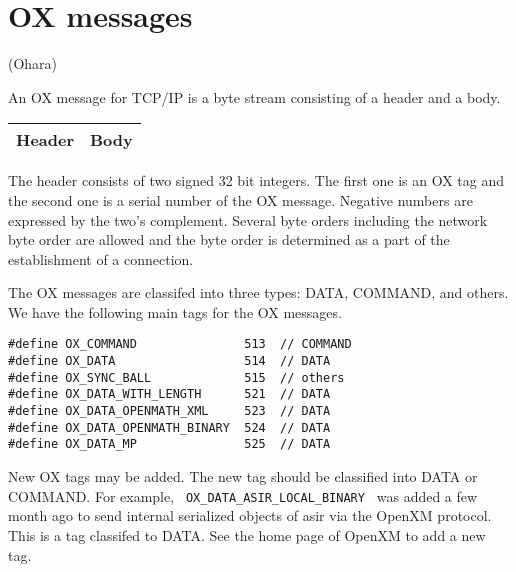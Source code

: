 
\section{OX messages}  (Ohara)

An OX message for TCP/IP is a byte stream consisting of
a header and a body.
\begin{center}
\begin{tabular}{|c|c|}
\hline
Header	& \hspace{10mm} Body \hspace{10mm} \\
\hline
\end{tabular}
\end{center}
The header consists of two signed 32 bit integers.
The first one is an OX tag 
and the second one is a serial number of the OX message.
Negative numbers are expressed by the two's complement.
Several byte orders including the network byte order
are allowed and the byte order is determined as a part of
the establishment of a connection.

The OX messages are classifed into three types:
DATA, COMMAND, and others.
We have the following main tags for the OX messages.
\begin{verbatim}
#define	OX_COMMAND               513  // COMMAND
#define	OX_DATA	                 514  // DATA
#define OX_SYNC_BALL             515  // others
#define OX_DATA_WITH_LENGTH      521  // DATA
#define OX_DATA_OPENMATH_XML     523  // DATA
#define OX_DATA_OPENMATH_BINARY  524  // DATA
#define OX_DATA_MP               525  // DATA
\end{verbatim}

New OX tags may be added.
The new tag should be classified into DATA or COMMAND.
For example, \verb+ OX_DATA_ASIR_LOCAL_BINARY +  was added a few month ago
to send internal serialized objects of asir via the OpenXM protocol.
This is a tag classifed to DATA.
See the home page of OpenXM to add a new tag.

